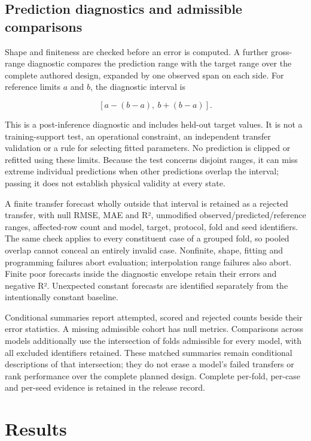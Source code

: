 \documentclass[10pt]{article}
\begin{document}
\subsection{Prediction diagnostics and admissible
comparisons}\label{prediction-diagnostics-and-admissible-comparisons}

Shape and finiteness are checked before an error is computed. A further
gross-range diagnostic compares the prediction range with the target
range over the complete authored design, expanded by one observed span
on each side. For reference limits \(a\) and \(b\), the diagnostic
interval is

\[[a-(b-a),\ b+(b-a)].\]

This is a post-inference diagnostic and includes held-out target values.
It is not a training-support test, an operational constraint, an
independent transfer validation or a rule for selecting fitted
parameters. No prediction is clipped or refitted using these limits.
Because the test concerns disjoint ranges, it can miss extreme
individual predictions when other predictions overlap the interval;
passing it does not establish physical validity at every state.

A finite transfer forecast wholly outside that interval is retained as a
rejected transfer, with null RMSE, MAE and R², unmodified
observed/predicted/reference ranges, affected-row count and model,
target, protocol, fold and seed identifiers. The same check applies to
every constituent case of a grouped fold, so pooled overlap cannot
conceal an entirely invalid case. Nonfinite, shape, fitting and
programming failures abort evaluation; interpolation range failures also
abort. Finite poor forecasts inside the diagnostic envelope retain their
errors and negative R². Unexpected constant forecasts are identified
separately from the intentionally constant baseline.

Conditional summaries report attempted, scored and rejected counts
beside their error statistics. A missing admissible cohort has null
metrics. Comparisons across models additionally use the intersection of
folds admissible for every model, with all excluded identifiers
retained. These matched summaries remain conditional descriptions of
that intersection; they do not erase a model's failed transfers or rank
performance over the complete planned design. Complete per-fold,
per-case and per-seed evidence is retained in the release record.

\section{Results}\label{results}
\end{document}
